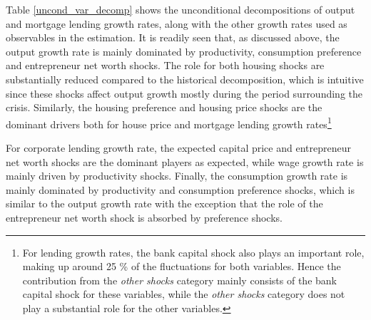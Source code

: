 \documentclass[12pt]{article}
\numberwithin{equation}{section}
\begin{document}
Table \ref{uncond_var_decomp} shows the unconditional decompositions of output and mortgage lending growth rates, along with the other growth rates used as observables in the estimation. It is readily seen that, as discussed above, the output growth rate is mainly dominated by productivity, consumption preference and entrepreneur net worth shocks. The role for both housing shocks are substantially reduced compared to the historical decomposition, which is intuitive since these shocks affect output growth mostly during the period surrounding the crisis. Similarly, the housing preference and housing price shocks are the dominant drivers both for house price and mortgage lending growth rates\footnote{For lending growth rates, the bank capital shock also plays an important role, making up around 25 \% of the fluctuations for both variables. Hence the contribution from the \textit{other shocks} category mainly consists of the bank capital shock for these variables, while the \textit{other shocks} category does not play a substantial role for the other variables.}

For corporate lending growth rate, the expected capital price and entrepreneur net worth shocks are the dominant players as expected, while wage growth rate is mainly driven by productivity shocks. Finally, the consumption growth rate is mainly dominated by productivity and consumption preference shocks, which is similar to the output growth rate with the exception that the role of the entrepreneur net worth shock is absorbed by preference shocks.








\end{document}
